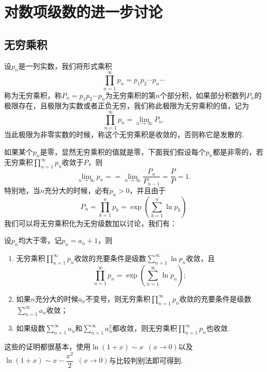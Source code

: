 \section{对数项级数的进一步讨论}
    \subsection{无穷乘积}
    \begin{definition}[无穷乘积]%
        设\({p_n}\)是一列实数，我们将形式乘积\[\prod_{n=1}^{\infty}p_n=p_1p_2\cdots p_n\cdots\]称为{\heiti 无穷乘积}，称\(P_n = p_1p_2\cdots p_n\)为无穷乘积的第\(n\)个{\heiti 部分积}，如果部分积数列\({P_n}\)的极限存在，且极限为实数或者正负无穷，我们称此极限为无穷乘积的值，记为\[\prod_{n = 1}^{\infty}p_n = \lim_{n\to\infty}P_n.\]
        当此极限为非零实数的时候，称这个无穷乘积是{\heiti 收敛}的，否则称它是{\heiti 发散}的.
    \end{definition}

    如果某个$p_n$是零，显然无穷乘积的值就是零，下面我们假设每个$p_n$都是非零的，若无穷乘积$\prod\limits_{n=1}^{\infty}p_n$收敛于\(P\)，则\[\lim_{n\to \infty}p_n = =\lim_{n\to\infty}\frac{P_n}{P_{n-1}} = \frac{P}{P} = 1.\]
    特别地，当\(n\)充分大的时候，必有\(p_n>0\)，并且由于\[P_n = \prod_{k=1}^{n}p_k = \exp\left(\sum\limits_{k=1}^{n}\ln p_k\right)\]我们可以将无穷乘积化为无穷级数加以讨论，我们有：

    \begin{theorem}
        设\(p_n\)均大于零，记\(p_n = a_n +1\)，则
        \begin{enumerate}
            \item 无穷乘积\(\prod\limits_{n=1}^{\infty}p_n\)收敛的充要条件是级数\(\sum\limits_{n=1}^{\infty}\ln p_n\)收敛，且\[\prod\limits_{n=1}^{\infty}p_n = \exp\left(\sum_{n=1}^{\infty}\ln p_n\right);\]
            \item 如果\(n\)充分大的时候\(a_n\)不变号，则无穷乘积\(\prod\limits_{n=1}^{\infty}p_n\)收敛的充要条件是级数\(\sum\limits_{n=1}^{\infty}a_n\)收敛；
            \item 如果级数\(\sum\limits_{n = 1}^{\infty}a_n\)和\(\sum\limits_{n = 1}^{\infty}a^2_n\)都收敛，则无穷乘积\(\prod\limits_{n=1}^{\infty}p_n\)也收敛.
        \end{enumerate}
    \end{theorem}

    这些的证明都很基本，使用\(\ln (1+x)\sim x\enspace(x\to0)\)以及\(\ln (1+x)\sim x-\dfrac{x^2}{2}\enspace(x\to0)\)与比较判别法即可得到.

